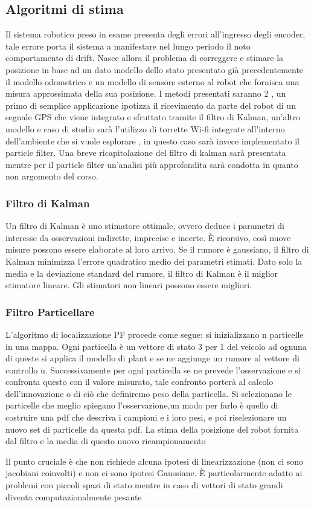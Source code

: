 \subsection{Algoritmi di stima}

Il sistema robotico preso in esame presenta degli errori all'ingresso degli encoder, tale errore porta il sistema a manifestare nel lungo periodo il noto comportamento di drift. Nasce allora il problema di correggere e stimare la posizione in base ad un dato modello dello stato presentato già precedentemente il modello odometrico e un modello di sensore esterno al robot che fornisca una misura approssimata della sua posizione. I metodi presentati saranno 2 , un primo di semplice applicazione ipotizza il ricevimento da parte del robot di un segnale GPS che viene integrato e sfruttato tramite il filtro di Kalman, un'altro modello e caso di studio sarà l'utilizzo di torrette Wi-fi integrate all'interno dell'ambiente che si vuole esplorare , in questo caso sarà invece implementato il particle filter. Una breve ricapitolazione del filtro di kalman sarà presentata mentre per il particle filter un'analisi più approfondita sarà condotta in quanto non argomento del corso.

\subsubsection{Filtro di Kalman}

Un filtro di Kalman è uno stimatore ottimale, ovvero deduce i parametri di interesse da osservazioni indirette, imprecise e incerte. È ricorsivo, così nuove misure possono essere elaborate al loro arrivo. 
Se il rumore è gaussiano, il filtro di Kalman minimizza l'errore quadratico medio dei parametri stimati.
Dato solo la media e la deviazione standard del rumore, il filtro di Kalman è il miglior stimatore lineare. Gli stimatori non lineari possono essere migliori.


\subsubsection{Filtro Particellare}

L'algoritmo di localizzazione PF procede come segue: si inizializzano n particelle in una mappa. Ogni particella è un vettore di stato 3 per 1 del veicolo ad ognuna di queste si applica il modello di plant e se ne aggiunge un rumore al vettore di controllo u. Successivamente per ogni particella se ne prevede l'osservazione e si confronta questo con il valore misurato, tale confronto porterà al calcolo dell'innovazione o di ciò che definiremo peso della particella.
Si selezionano le particelle che meglio spiegano l'osservazione,un modo per farlo è quello di costruire una pdf che descriva i campioni e i loro pesi, e poi riselezionare un nuovo set di particelle da questa pdf.
La stima della posizione del robot fornita dal filtro e la media di questo nuovo ricampionamento

Il punto cruciale è che non richiede alcuna ipotesi di linearizzazione (non ci sono jacobiani coinvolti) e non ci sono ipotesi Gaussiane. È particolarmente adatto ai problemi con piccoli spazi di stato mentre in caso di vettori di stato grandi diventa computazionalmente pesante

